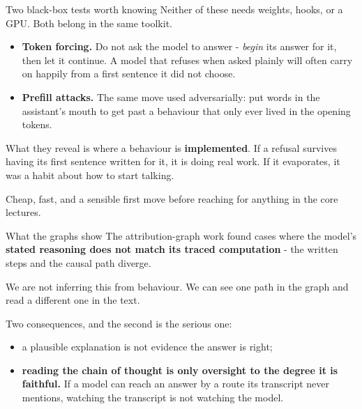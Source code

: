 \documentclass[aspectratio=169]{beamer}
\newcommand{\keybox}[1]{%
  \begin{tcolorbox}[colback=armblue!8, colframe=armblue, boxrule=0.6pt, arc=2pt]
  #1
  \end{tcolorbox}}
\begin{document}
\begin{frame}{Two black-box tests worth knowing}
  \vspace{0.5em}
  Neither of these needs weights, hooks, or a GPU. Both belong in the same toolkit.

  \vspace{0.7em}
  \begin{itemize}
    \item \textbf{Token forcing.} Do not ask the model to answer - \emph{begin} its answer for
      it, then let it continue. A model that refuses when asked plainly will often carry on
      happily from a first sentence it did not choose.
    \item \textbf{Prefill attacks.} The same move used adversarially: put words in the
      assistant's mouth to get past a behaviour that only ever lived in the opening tokens.
  \end{itemize}

  \vspace{0.8em}
  \keybox{What they reveal is where a behaviour is \textbf{implemented}. If a refusal survives
  having its first sentence written for it, it is doing real work. If it evaporates, it was a
  habit about how to start talking.}

  \vspace{0.6em}
  {\footnotesize Cheap, fast, and a sensible first move before reaching for anything in the
  core lectures.}
\end{frame}

\begin{frame}{What the graphs show}
  \vspace{0.8em}
  The attribution-graph work found cases where the model's \textbf{stated reasoning does not
  match its traced computation} - the written steps and the causal path diverge.

  \vspace{1.0em}
  \keybox{We are not inferring this from behaviour. We can see one path in the graph and read a
  different one in the text.}

  \vspace{1.0em}
  Two consequences, and the second is the serious one:

  \vspace{0.5em}
  \begin{itemize}
    \item a plausible explanation is not evidence the answer is right;
    \item \textbf{reading the chain of thought is only oversight to the degree it is faithful.}
      If a model can reach an answer by a route its transcript never mentions, watching the
      transcript is not watching the model.
  \end{itemize}
\end{frame}
\end{document}
